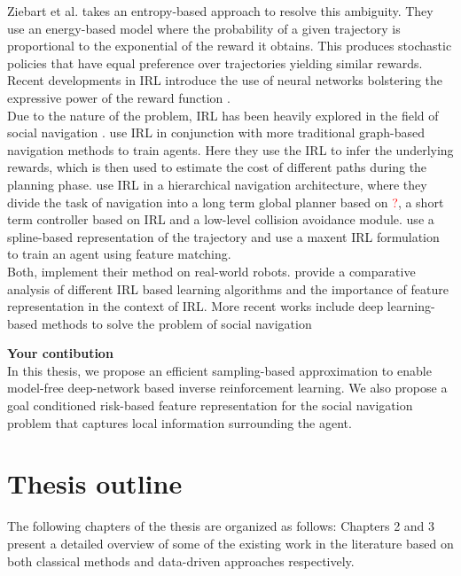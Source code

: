 Ziebart et al. \cite{ziebart_maxent_2008} takes an entropy-based approach to resolve this ambiguity. They use an energy-based model where the probability of a given trajectory is proportional to the exponential of the reward it obtains. This produces stochastic policies that have equal preference over trajectories yielding similar rewards. Recent developments in IRL introduce the use of neural networks bolstering the expressive power of the reward function \cite{wulfmeier2015maxmium}. \\

Due to the nature of the problem, IRL has been heavily explored in the field of social navigation \cite{kuderer_socially_nodate , kretzschmar_socially_2016 }. \cite{shiarlis_rapidly_2017, okal_efcient_nodate} use IRL in conjunction with more traditional graph-based navigation methods to train agents. Here they use the IRL to infer the underlying rewards, which is then used to estimate the cost of different paths during the planning phase. \cite{kim_socially_2016} use IRL in a hierarchical navigation architecture, where they divide the task of navigation into a long term global planner based on \textcolor{red}{?}, a short term controller based on IRL and a low-level collision avoidance module. \cite{kretzschmar_socially_2016} use a spline-based representation of the trajectory and use a maxent IRL formulation to train an agent using feature matching. 
\\
Both,\cite{kim_socially_2016, kretzschmar_socially_2016} implement their method on real-world robots. \cite{vasquez_inverse_2014} provide a comparative analysis of different IRL based learning algorithms and the importance of feature representation in the context of IRL. More recent works include deep learning-based methods to solve the problem of social navigation \cite{fahad_learning_2018, wulfmeier2015maximum}

\textbf{Your contibution}\\
In this thesis, we propose an efficient sampling-based approximation to enable model-free deep-network based inverse reinforcement learning. We also propose a goal conditioned risk-based feature representation for the social navigation problem that captures local information surrounding the agent. 

\section{Thesis outline}
The following chapters of the thesis are organized as follows:
Chapters 2 and 3 present a detailed overview of some of the existing work in the literature based on both classical methods and data-driven approaches respectively.

